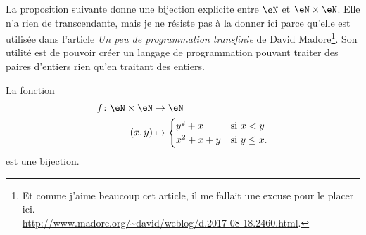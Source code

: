 \begin{normaltext}	\label{NORMooBijectionNNMadore}
	La proposition suivante donne une bijection explicite entre \( \eN\) et \( \eN\times \eN\). Elle n'a rien de transcendante, mais je ne résiste pas à la donner ici parce qu'elle est utilisée dans l'article \emph{Un peu de programmation transfinie} de David Madore\footnote{Et comme j'aime beaucoup cet article, il me fallait une excuse pour le placer ici.\\ \url{http://www.madore.org/~david/weblog/d.2017-08-18.2460.html}.}. Son utilité est de pouvoir créer un langage de programmation pouvant traiter des paires d'entiers rien qu'en traitant des entiers.
\end{normaltext}

\begin{proposition}        \label{PROPooLPKUooAlsYJg}
	La fonction
	\begin{equation}
		\begin{aligned}
			f\colon \eN\times \eN & \to \eN                               \\
			(x,y)                 & \mapsto \begin{cases}
				                                y^2+x   & \text{si } x<y      \\
				                                x^2+x+y & \text{si } y\leq x.
			                                \end{cases}
		\end{aligned}
	\end{equation}
	est une bijection.
\end{proposition}

